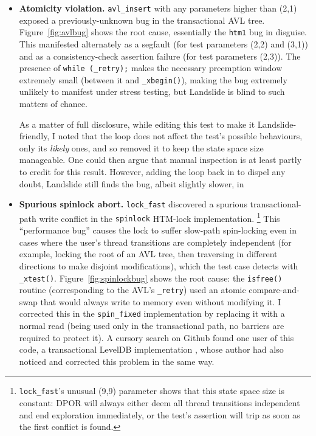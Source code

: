 \begin{itemize}
	\item
	{\bf Atomicity violation.}
	{\tt avl\_insert} with any parameters higher than (2,1)
	exposed a previously-unknown bug in the transactional AVL tree.
	Figure~\ref{fig:avlbug} shows the root cause, essentially the {\tt htm1} bug in disguise.
	This manifested
	alternately
	as a segfault (for test parameters (2,2) and (3,1)) %
	and
	as a consistency-check assertion failure (for test parameters (2,3)).
	The presence of {\tt while (\_retry);} makes the necessary preemption window extremely small
	(between it and {\tt \_xbegin()}),
	making the bug extremely unlikely to manifest under stress testing,
	but Landslide is blind to such matters of chance.

	As a matter of full disclosure,
	while editing this test to make it Landslide-friendly,
	I noted that the loop does not affect the test's possible behaviours,
	only its {\em likely} ones,
	and so removed it to keep the state space size manageable.
	One could then argue that manual inspection is at least partly to credit for this result.
	However, adding the loop back in to dispel any doubt,
	Landslide still finds the bug,
	albeit slightly slower,
	in %
	\item
	{\bf Spurious spinlock abort.}
	{\tt lock\_fast} discovered a spurious transactional-path write conflict
	in the {\tt spinlock} HTM-lock implementation.%
	\footnote{{\tt lock\_fast}'s unusual (9,9) parameter shows that this state space size is constant: %
	DPOR will always either deem all thread transitions independent and end exploration immediately,
	or the test's assertion will trip as soon as the first conflict is found.}
	This ``performance bug'' causes the lock to suffer slow-path spin-locking
	even in cases where the user's thread transitions are completely independent
	(for example, locking the root of an AVL tree,
	then traversing in different directions to make disjoint modifications),
	which the test case detects with {\tt \_xtest()}.
	Figure~\ref{fig:spinlockbug} shows the root cause:
	the {\tt isfree()} routine (corresponding to the AVL's {\tt \_retry})
	used an atomic compare-and-swap that would always write to memory even without modifying it.
	I corrected this in the {\tt spin\_fixed} implementation by replacing it
	with a normal read
	(being used only in the transactional path, no barriers are required to protect it).
	A cursory search on Github found one user of this code,
	a transactional LevelDB implementation \cite{htm-leveldb-github},
	whose author had also noticed and corrected this problem in the same way.


\end{itemize}
